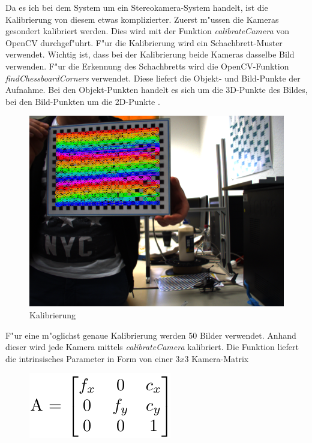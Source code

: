 \noindent Da es ich bei dem System um ein Stereokamera-System handelt, ist die Kalibrierung von diesem etwas komplizierter.\newline
Zuerst m"ussen die Kameras gesondert kalibriert werden. Dies wird mit der Funktion \textit{calibrateCamera} von OpenCV durchgef"uhrt. F"ur die Kalibrierung wird ein Schachbrett-Muster verwendet. Wichtig ist, dass bei der Kalibrierung beide Kameras dasselbe Bild verwenden. F"ur die Erkennung des Schachbretts wird die OpenCV-Funktion \textit{findChessboardCorners} verwendet. Diese liefert die Objekt- und Bild-Punkte der Aufnahme. Bei den Objekt-Punkten handelt es sich um die 3D-Punkte des Bildes, bei den Bild-Punkten um die 2D-Punkte \cite{OcvD}.

\begin{figure}[H]
	\includegraphics[scale=0.4]{bilder/calibration}
	\caption[Kalibrierung]{Kalibrierung}
\end{figure}

\noindent F"ur eine m"oglichst genaue Kalibrierung werden 50 Bilder verwendet. Anhand dieser wird jede Kamera mittels \textit{calibrateCamera} kalibriert.\newline
Die Funktion liefert die intrinsisches Parameter in Form von einer $3x3$ Kamera-Matrix

\begin{figure}[H]
	\includegraphics[scale=0.75]{bilder/matrix}
\end{figure}

